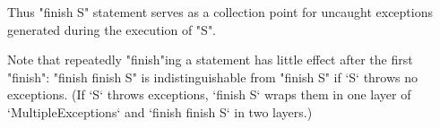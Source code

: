 Thus \xcd"finish S" statement serves as a collection point for
uncaught exceptions generated during the execution of \xcd"S".

Note that repeatedly \xcd"finish"ing a statement has little effect after
the first \xcd"finish": \xcd"finish finish S" is indistinguishable
from \xcd"finish S" if \xcd`S` throws no exceptions.  (If \xcd`S` throws
exceptions, \xcd`finish S` wraps them in one layer of 
\xcd`MultipleExceptions` and \xcd`finish finish S` in two layers.)

